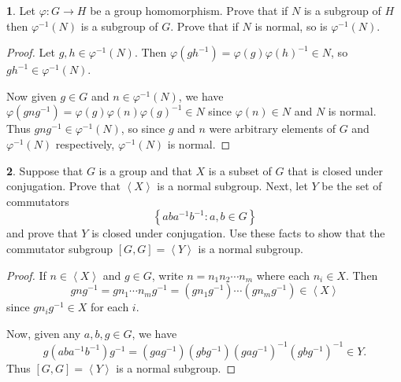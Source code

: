\documentclass[12pt]{article}
\theoremstyle{definition}
\newtheorem{ex}{}
\begin{document}
\begin{ex}
	Let $\varphi: G \to H$ be a group homomorphism.
	Prove that if $N$ is a subgroup of $H$ then $\varphi^{-1}(N)$ is a subgroup of $G$.
	Prove that if $N$ is normal, so is $\varphi^{-1}(N)$.
\end{ex}
\begin{proof}
	Let $g, h \in \varphi^{-1}(N)$.
	Then $\varphi(gh^{-1}) = \varphi(g)\varphi(h)^{-1} \in N$, so $gh^{-1} \in \varphi^{-1}(N)$.

	Now given $g \in G$ and $n \in \varphi^{-1}(N)$, we have $\varphi(gng^{-1}) = \varphi(g)\varphi(n)\varphi(g)^{-1} \in N$ since $\varphi(n) \in N$ and $N$ is normal.
	Thus $gng^{-1} \in \varphi^{-1}(N)$, so since $g$ and $n$ were arbitrary elements of $G$ and $\varphi^{-1}(N)$ respectively, $\varphi^{-1}(N)$ is normal.
\end{proof}

\begin{ex}
	Suppose that $G$ is a group and that $X$ is a subset of $G$ that is closed under conjugation.
	Prove that $\left\langle X \right\rangle$ is a normal subgroup.
	Next, let $Y$ be the set of commutators \begin{equation*}
		\left\lbrace aba^{-1}b^{-1} : a, b \in G \right\rbrace
	\end{equation*}
	and prove that $Y$ is closed under conjugation.
	Use these facts to show that the commutator subgroup $[G,G] = \left\langle Y \right\rangle$ is a normal subgroup.
\end{ex}
\begin{proof}
	If $n \in \left\langle X \right\rangle$ and $g \in G$, write $n=n_1n_2 \cdots n_m$ where each $n_i \in X$.
	Then \begin{equation*}
		gng^{-1} = gn_1\cdots n_m g^{-1} = (gn_1g^{-1})\cdots(gn_mg^{-1}) \in \left\langle X \right\rangle
	\end{equation*}
	since $gn_ig^{-1} \in X$ for each $i$.

	Now, given any $a, b, g \in G$, we have \begin{equation*}
		g(aba^{-1}b^{-1})g^{-1} = (gag^{-1})(gbg^{-1})(gag^{-1})^{-1}(gbg^{-1})^{-1} \in Y.
	\end{equation*}
	Thus $[G,G] = \left\langle Y \right\rangle$ is a normal subgroup.
\end{proof}
\end{document}

